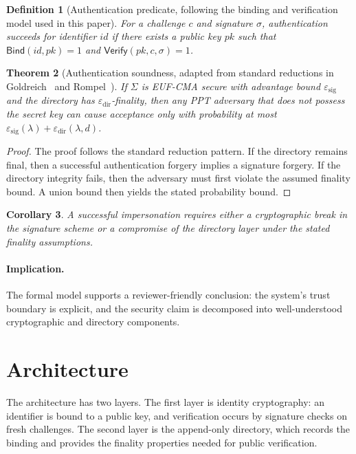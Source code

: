 \documentclass[11pt,a4paper]{article}
\newtheorem{theorem}{Theorem}[section]
\newtheorem{definition}[theorem]{Definition}
\newtheorem{corollary}[theorem]{Corollary}
\begin{document}
\begin{definition}[Authentication predicate, following the binding and verification model used in this paper]
For a challenge $c$ and signature $\sigma$, authentication succeeds for identifier $id$ if there exists a public key $pk$ such that $\mathsf{Bind}(id,pk)=1$ and $\mathsf{Verify}(pk,c,\sigma)=1$.
\end{definition}

\begin{theorem}[Authentication soundness, adapted from standard reductions in Goldreich~\cite{goldreich2001} and Rompel~\cite{rompel1990}]
If $\Sigma$ is EUF-CMA secure with advantage bound $\varepsilon_{\mathrm{sig}}$ and the directory has $\varepsilon_{\mathrm{dir}}$-finality, then any PPT adversary that does not possess the secret key can cause acceptance only with probability at most $\varepsilon_{\mathrm{sig}}(\lambda)+\varepsilon_{\mathrm{dir}}(\lambda,d)$.
\end{theorem}

\begin{proof}
The proof follows the standard reduction pattern. If the directory remains final, then a successful authentication forgery implies a signature forgery. If the directory integrity fails, then the adversary must first violate the assumed finality bound. A union bound then yields the stated probability bound.
\end{proof}

\begin{corollary}
A successful impersonation requires either a cryptographic break in the signature scheme or a compromise of the directory layer under the stated finality assumptions.
\end{corollary}

\paragraph{Implication.} The formal model supports a reviewer-friendly conclusion: the system's trust boundary is explicit, and the security claim is decomposed into well-understood cryptographic and directory components.

\section{Architecture}

The architecture has two layers. The first layer is identity cryptography: an identifier is bound to a public key, and verification occurs by signature checks on fresh challenges. The second layer is the append-only directory, which records the binding and provides the finality properties needed for public verification.
\end{document}
